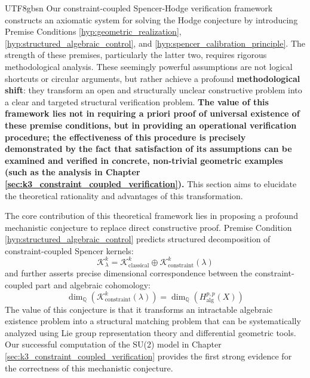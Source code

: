 \documentclass[a4paper,12pt]{extarticle}
\theoremstyle{definition}
\begin{document}
\begin{CJK}{UTF8}{gbsn}
Our constraint-coupled Spencer-Hodge verification framework constructs an axiomatic system for solving the Hodge conjecture by introducing Premise Conditions \ref{hyp:geometric_realization}, \ref{hyp:structured_algebraic_control}, and \ref{hyp:spencer_calibration_principle}. The strength of these premises, particularly the latter two, requires rigorous methodological analysis. These seemingly powerful assumptions are not logical shortcuts or circular arguments, but rather achieve a profound \textbf{methodological shift}: they transform an open and structurally unclear constructive problem into a clear and targeted structural verification problem. \textbf{The value of this framework lies not in requiring a priori proof of universal existence of these premise conditions, but in providing an operational verification procedure; the effectiveness of this procedure is precisely demonstrated by the fact that satisfaction of its assumptions can be examined and verified in concrete, non-trivial geometric examples (such as the analysis in Chapter \ref{sec:k3_constraint_coupled_verification}).} This section aims to elucidate the theoretical rationality and advantages of this transformation.

The core contribution of this theoretical framework lies in proposing a profound mechanistic conjecture to replace direct constructive proof. Premise Condition \ref{hyp:structured_algebraic_control} predicts structured decomposition of constraint-coupled Spencer kernels:
\begin{equation}
\label{eq:kernel_decomposition_recap}
\mathcal{K}^k_\lambda = \mathcal{K}^k_{\text{classical}} \oplus \mathcal{K}^k_{\text{constraint}}(\lambda)
\end{equation}
and further asserts precise dimensional correspondence between the constraint-coupled part and algebraic cohomology:
\begin{equation}
\label{eq:algebraic_correspondence_recap}
\dim_{\mathbb{Q}}(\mathcal{K}^k_{\text{constraint}}(\lambda)) = \dim_{\mathbb{Q}}(H_{\text{alg}}^{p,p}(X))
\end{equation}
The value of this conjecture is that it transforms an intractable algebraic existence problem into a structural matching problem that can be systematically analyzed using Lie group representation theory and differential geometric tools. Our successful computation of the SU(2) model in Chapter \ref{sec:k3_constraint_coupled_verification} provides the first strong evidence for the correctness of this mechanistic conjecture.


\end{CJK}
\end{document}
